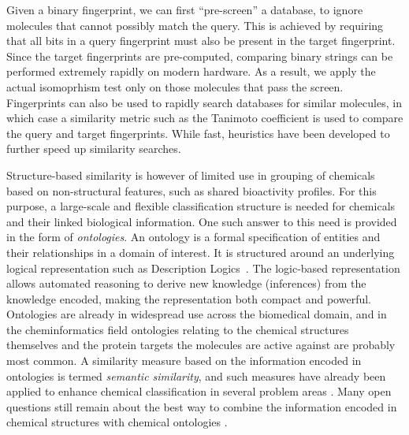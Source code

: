 \documentclass{sig-alternate}
\begin{document}
Given a binary fingerprint, we can first ``pre-screen'' a database, to
ignore molecules that cannot possibly match the query. This is
achieved by requiring that all bits in a query fingerprint must also
be present in the target fingerprint. Since the target fingerprints
are pre-computed, comparing binary strings can be performed extremely
rapidly on modern hardware. As a result, we apply the actual
isomoprhism test only on those molecules that pass the
screen. Fingerprints can also be used to rapidly search databases for
similar molecules, in which case a similarity metric such as the
Tanimoto coefficient is used to compare the query and target
fingerprints. While fast, heuristics have been developed
\cite{Swamidass:2007ve} to further
speed up similarity searches.

%
Structure-based similarity is however of limited use in grouping of
chemicals based on non-structural features, such as shared bioactivity
profiles. For this purpose, a large-scale and flexible classification
structure is needed for chemicals and their linked biological
information. One such answer to this need is provided in the form of
\emph{ontologies}.  An ontology is a formal specification of entities
and their relationships in a domain of interest. It is structured
around an underlying logical representation such as Description
Logics~\cite{baaderdl2007}. The logic-based representation allows
automated reasoning to derive new knowledge (inferences) from the
knowledge encoded, making the representation both compact and
powerful.  Ontologies are already in widespread use across the
biomedical domain, and in the cheminformatics field ontologies
relating to the chemical structures themselves and the protein targets
the molecules are active against are probably most common. A
similarity measure based on the information encoded in ontologies is
termed \emph{semantic similarity}, and such measures have already been
applied to enhance chemical classification in several problem areas
\cite{couto2010}. Many open questions still remain about the best way
to combine the information encoded in chemical structures with
chemical ontologies \cite{hastingsowled2010}.
\end{document}
